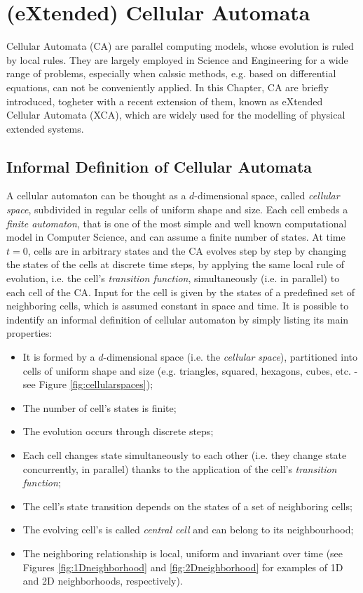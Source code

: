 \chapter{(eXtended) Cellular Automata}

Cellular Automata (CA) are parallel computing models, whose evolution
is ruled by local rules. They are largely employed in Science and
Engineering for a wide range of problems, especially when calssic
methods, e.g. based on differential equations, can not be conveniently
applied. In this Chapter, CA are briefly introduced, togheter with a
recent extension of them, known as eXtended Cellular Automata (XCA),
which are widely used for the modelling of physical extended systems.


\section{Informal Definition of Cellular Automata}

A cellular automaton can be thought as a $d$-dimensional space, called
\emph{cellular space}, subdivided in regular cells of uniform shape
and size. Each cell embeds a \emph{finite automaton}, that is one of
the most simple and well known computational model in Computer
Science, and can assume a finite number of states. At time $t=0$,
cells are in arbitrary states and the CA evolves step by step by
changing the states of the cells at discrete time steps, by applying
the same local rule of evolution, i.e. the cell's \emph{transition
  function}, simultaneously (i.e. in parallel) to each cell of the
CA. Input for the cell is given by the states of a predefined set of
neighboring cells, which is assumed constant in space and time. It is
possible to indentify an informal definition of cellular automaton by
simply listing its main properties:

\begin{itemize}
\item It is formed by a $d$-dimensional space (i.e. the \emph{cellular
  space}), partitioned into cells of uniform shape and size
  (e.g. triangles, squared, hexagons, cubes, etc. - see Figure
  \ref{fig:cellularspaces});
\item The number of cell's states is finite;
\item The evolution occurs through discrete steps;
\item Each cell changes state simultaneously to each other (i.e. they
  change state concurrently, in parallel) thanks to the application of
  the cell's \emph{transition function};
\item The cell's state transition depends on the states of a set of neighboring cells;
\item The evolving cell's is called \emph{central cell} and can belong
  to its neighbourhood;
\item The neighboring relationship is local, uniform and invariant
  over time (see Figures \ref{fig:1Dneighborhood} and
  \ref{fig:2Dneighborhood} for examples of 1D and 2D neighborhoods,
  respectively).
\end{itemize}

